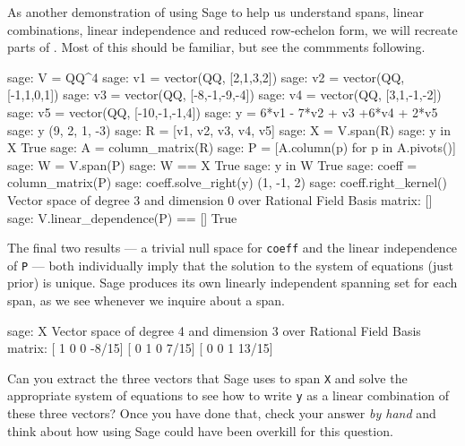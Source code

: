 As another demonstration of using Sage to help us understand spans, linear combinations, linear independence and reduced row-echelon form, we will recreate parts of .  Most of this should be familiar, but see the commments following.
%
\begin{sageexample}
sage: V = QQ^4
sage: v1 = vector(QQ, [2,1,3,2])
sage: v2 = vector(QQ, [-1,1,0,1])
sage: v3 = vector(QQ, [-8,-1,-9,-4])
sage: v4 = vector(QQ, [3,1,-1,-2])
sage: v5 = vector(QQ, [-10,-1,-1,4])
sage: y = 6*v1 - 7*v2 + v3 +6*v4 + 2*v5
sage: y
(9, 2, 1, -3)
sage: R = [v1, v2, v3, v4, v5]
sage: X = V.span(R)
sage: y in X
True
sage: A = column_matrix(R)
sage: P = [A.column(p) for p in A.pivots()]
sage: W = V.span(P)
sage: W == X
True
sage: y in W
True
sage: coeff = column_matrix(P)
sage: coeff.solve_right(y)
(1, -1, 2)
sage: coeff.right_kernel()
Vector space of degree 3 and dimension 0 over Rational Field
Basis matrix:
[]
sage: V.linear_dependence(P) == []
True
\end{sageexample}
%
The final two results --- a trivial null space for \verb?coeff? and the linear independence of \verb?P? --- both individually imply that the solution to the system of equations (just prior) is unique.  Sage produces its own linearly independent spanning set for each span, as we see whenever we inquire about a span.
%
\begin{sageexample}
sage: X
Vector space of degree 4 and dimension 3 over Rational Field
Basis matrix:
[    1     0     0 -8/15]
[    0     1     0  7/15]
[    0     0     1 13/15]
\end{sageexample}
%
Can you extract the three vectors that Sage uses to span \verb?X? and solve the appropriate system of equations to see how to write \verb?y? as a linear combination of these three vectors?  Once you have done that, check your answer \emph{by hand} and think about how using Sage could have been overkill for this question.
%
\begin{sageverbatim}
\end{sageverbatim}
%

%